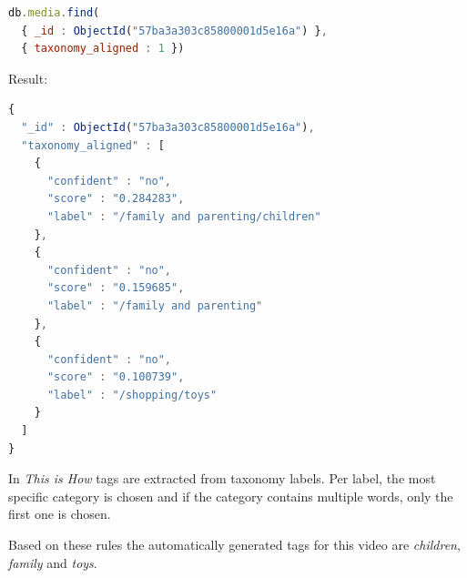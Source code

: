 \begin{lstlisting}[language=javascript,frame=tb]
db.media.find(
  { _id : ObjectId("57ba3a303c85800001d5e16a") },
  { taxonomy_aligned : 1 })
\end{lstlisting}

Result:

\begin{lstlisting}[language=javascript,frame=tb]
{
  "_id" : ObjectId("57ba3a303c85800001d5e16a"),
  "taxonomy_aligned" : [
    {
      "confident" : "no",
      "score" : "0.284283",
      "label" : "/family and parenting/children"
    },
    {
      "confident" : "no",
      "score" : "0.159685",
      "label" : "/family and parenting"
    },
    {
      "confident" : "no",
      "score" : "0.100739",
      "label" : "/shopping/toys"
    }
  ]
}
\end{lstlisting}

In \textit{This is How} tags are extracted from taxonomy labels. Per label, the most specific category is chosen and if the category contains multiple words, only the first one is chosen. 

Based on these rules the automatically generated tags for this video are \textit{children}, \textit{family} and \textit{toys}.